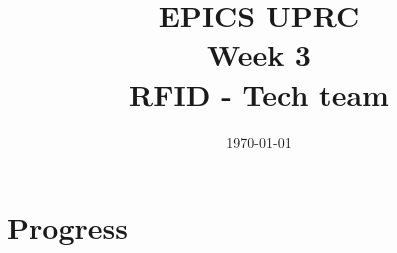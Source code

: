 \documentclass{article}
\title{EPICS UPRC \\ Week 3 \\ RFID - Tech team} %
\date{\today} %
\begin{document}
\maketitle %



\section{Progress}
\end{document}
